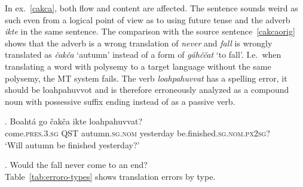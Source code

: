 \documentclass{flammie}
\begin{document}
In ex.~\ref{cakca}, both flow and content are affected. The sentence sounds
weird as such even from a logical point of view as to using future tense and the
adverb \textit{ikte} in the same sentence. The comparison with the source
sentence~\ref{cakcaorig} shows that the adverb is a wrong translation of
\textit{never} and \textit{fall} is wrongly translated as \textit{čakča}
`autumn' instead of a form of \textit{gáhččat} `to fall'. I.e.\ when translating
a word with polysemy to a target language without the same polysemy, the MT
system fails.  The verb \textit{loahpahuvvat} has a spelling error, it should be
{loahpahuvvot} and is therefore erroneously analyzed as a compound noun with
possessive suffix ending instead of as a passive verb.




\exg. Boahtá go čakča ikte loahpahuvvat?\label{cakca}\\
come\textsc{.pres.3.sg} \textsc{QST} autumn\textsc{.sg.nom} yesterday
be.finished\textsc{.sg.nom.px2sg}?\\
`Will autumn be finished yesterday?'


\ex. Would the fall never come to an end?\label{cakcaorig}\\



Table~\ref{tab:erroro-types} shows translation errors by type.
\end{document}
